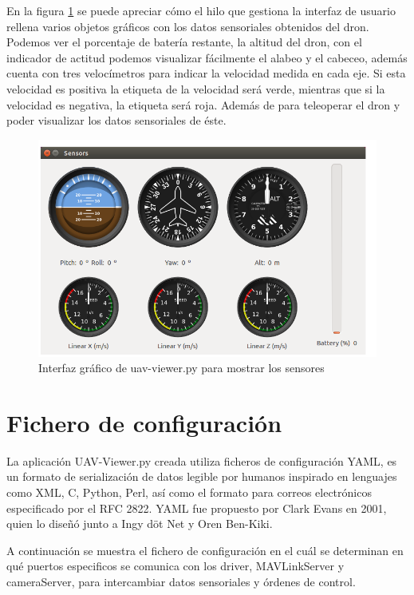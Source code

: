 En la figura \ref{fig:sensores} se puede apreciar cómo el hilo que gestiona la interfaz de usuario rellena varios objetos gráficos con los datos sensoriales obtenidos del dron. Podemos ver el porcentaje de batería restante, la altitud del dron, con el indicador de actitud podemos visualizar fácilmente el alabeo y el cabeceo, además cuenta con tres velocímetros para indicar la velocidad medida en cada eje. Si esta velocidad es positiva la etiqueta de la velocidad será verde, mientras que si la velocidad es negativa, la etiqueta será roja.
Además de para teleoperar el dron y poder visualizar los datos sensoriales de éste.

\begin{figure}[H]
  \centering
  \includegraphics[scale=0.4]{imagenes/sensores.png}
  \caption{Interfaz gráfico de uav-viewer.py para mostrar los sensores}
  \label{fig:sensores}
\end{figure}

\section{Fichero de configuración}

La aplicación UAV-Viewer.py creada utiliza ficheros de configuración YAML, es un formato de serialización de datos legible por humanos inspirado en lenguajes como XML, C, Python, Perl, así como el formato para correos electrónicos especificado por el RFC 2822. YAML fue propuesto por Clark Evans en 2001, quien lo diseñó junto a Ingy döt Net y Oren Ben-Kiki.

A continuación se muestra el fichero de configuración en el cuál se determinan en qué puertos especificos se comunica con los driver, MAVLinkServer y cameraServer, para intercambiar datos sensoriales y órdenes de control.

